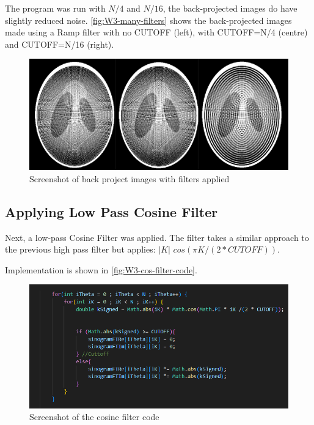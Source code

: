 The program was run with $N/4$ and $N/16$, the back-projected images do have slightly reduced noise. \autoref{fig:W3-many-filters} shows the back-projected images made using a Ramp filter with no CUTOFF (left), with CUTOFF=N/4 (centre) and CUTOFF=N/16 (right).  



\begin{figure}[H] 
    \centering
    \includegraphics[width=1\columnwidth]{Figures/Week 3/filtered-images-ramp-N-4-N-16.png}
    \caption{Screenshot of back project images with filters applied}
    \label{fig:W3-many-filters}
\end{figure}


\newpage
\subsection{Applying Low Pass Cosine Filter}

Next, a low-pass Cosine Filter was applied. The filter takes a similar approach to the previous high pass filter but applies: $|K|$  $cos(\pi K /(2  *  CUTOFF))$.

Implementation is shown in \autoref{fig:W3-cos-filter-code}. 

\begin{figure}[H] 
    \centering
    \includegraphics[width=1\columnwidth]{Figures/Week 3/filter-cos-codfe.png}
    \caption{Screenshot of the cosine filter code}
    \label{fig:W3-cos-filter-code}
\end{figure}

